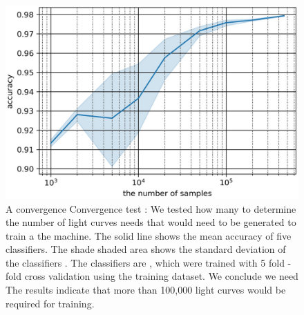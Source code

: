 \documentclass[proof]{pasj01}
\providecommand{\DIFadd}[1]{{\protect\color{blue} \sf #1}} %
\providecommand{\DIFdel}[1]{{\protect\color{red} \scriptsize #1}} %
\providecommand{\DIFaddFL}[1]{\DIFadd{#1}} %
\providecommand{\DIFdelFL}[1]{\DIFdel{#1}} %
\providecommand{\DIFaddbeginFL}{} %
\providecommand{\DIFaddendFL}{} %
\providecommand{\DIFdelbeginFL}{} %
\providecommand{\DIFdelendFL}{} %
\newcommand{\DIFscaledelfig}{0.5}
\newlength{\DIFdelgraphicswidth} %
\newlength{\DIFdelgraphicsheight} %
\newcommand{\DIFaddincludegraphics}[2][]{{\color{blue}\fbox{\DIFOincludegraphics[#1]{#2}}}} %
\newcommand{\DIFdelincludegraphics}[2][]{%
\sbox{\DIFdelgraphicsbox}{\DIFOincludegraphics[#1]{#2}}%
\settoboxwidth{\DIFdelgraphicswidth}{\DIFdelgraphicsbox} %
\settoboxtotalheight{\DIFdelgraphicsheight}{\DIFdelgraphicsbox} %
\scalebox{\DIFscaledelfig}{%
\parbox[b]{\DIFdelgraphicswidth}{\usebox{\DIFdelgraphicsbox}\\[-\baselineskip] \rule{\DIFdelgraphicswidth}{0em}}\llap{\resizebox{\DIFdelgraphicswidth}{\DIFdelgraphicsheight}{%
\setlength{\unitlength}{\DIFdelgraphicswidth}%
\begin{picture}(1,1)%
\thicklines\linethickness{2pt} %
{\color[rgb]{1,0,0}\put(0,0){\framebox(1,1){}}}%
{\color[rgb]{1,0,0}\put(0,0){\line( 1,1){1}}}%
{\color[rgb]{1,0,0}\put(0,1){\line(1,-1){1}}}%
\end{picture}%
}\hspace*{3pt}}} %
} %
\DeclareRobustCommand{\DIFaddbeginFL}{\DIFOaddbeginFL \let\includegraphics\DIFaddincludegraphics} %
\DeclareRobustCommand{\DIFaddendFL}{\DIFOaddendFL \let\includegraphics\DIFOincludegraphics} %
\DeclareRobustCommand{\DIFdelbeginFL}{\DIFOdelbeginFL \let\includegraphics\DIFdelincludegraphics} %
\DeclareRobustCommand{\DIFdelendFL}{\DIFOaddendFL \let\includegraphics\DIFOincludegraphics} %
\begin{document}
%
%
\begin{figure}[htbp]
  \begin{center}
     \includegraphics[width=\columnwidth]{figures/size_accuracy.eps}
  \end{center}
  \caption{%
\DIFdelbeginFL \DIFdelFL{A convergence }\DIFdelendFL \DIFaddbeginFL \DIFaddFL{Convergence }\DIFaddendFL test \DIFdelbeginFL \DIFdelFL{: We tested how many }\DIFdelendFL \DIFaddbeginFL \DIFaddFL{to determine the number of }\DIFaddendFL light curves \DIFdelbeginFL \DIFdelFL{needs }\DIFdelendFL \DIFaddbeginFL \DIFaddFL{that would need }\DIFaddendFL to be generated to train \DIFdelbeginFL \DIFdelFL{a }\DIFdelendFL \DIFaddbeginFL \DIFaddFL{the }\DIFaddendFL machine. 
The solid line shows the mean accuracy of five classifiers. The \DIFdelbeginFL \DIFdelFL{shade }\DIFdelendFL \DIFaddbeginFL \DIFaddFL{shaded }\DIFaddendFL area shows the standard deviation of the classifiers\DIFdelbeginFL \DIFdelFL{. The classifiers are }\DIFdelendFL \DIFaddbeginFL \DIFaddFL{, which were }\DIFaddendFL trained with \DIFdelbeginFL \DIFdelFL{5 fold }\DIFdelendFL \DIFaddbeginFL \DIFaddFL{5-fold }\DIFaddendFL cross validation using the training dataset. \DIFdelbeginFL \DIFdelFL{We conclude we need }\DIFdelendFL \DIFaddbeginFL \DIFaddFL{The results indicate that }\DIFaddendFL more than 100,000 light curves \DIFaddbeginFL \DIFaddFL{would be required }\DIFaddendFL for training.
  }%
  \label{fig:size_convergence_test}
\end{figure}
%

%
\end{document}

